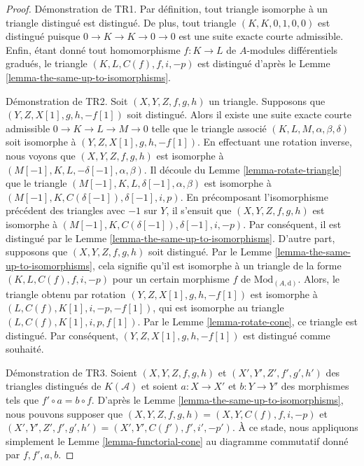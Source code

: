 \begin{proof}
Démonstration de TR1. Par définition, tout triangle isomorphe à un triangle
distingué est distingué. De plus, tout triangle $(K, K, 0, 1, 0, 0)$ est distingué
puisque $0 \to K \to K \to 0 \to 0$ est une suite exacte courte admissible. Enfin,
étant donné tout homomorphisme $f : K \to L$ de $A$-modules différentiels
gradués, le triangle $(K, L, C(f), f, i, -p)$ est distingué d'après le Lemme
\ref{lemma-the-same-up-to-isomorphisms}.

\medskip\noindent
Démonstration de TR2. Soit $(X, Y, Z, f, g, h)$ un triangle. Supposons que $(Y, Z,
X[1], g, h, -f[1])$ soit distingué. Alors il existe une suite exacte courte
admissible $0 \to K \to L \to M \to 0$ telle que le triangle associé $(K, L, M,
\alpha, \beta, \delta)$ soit isomorphe à $(Y, Z, X[1], g, h, -f[1])$. En
effectuant une rotation inverse, nous voyons que $(X, Y, Z, f, g, h)$ est
isomorphe à $(M[-1], K, L, -\delta[-1], \alpha, \beta)$. Il découle du Lemme
\ref{lemma-rotate-triangle} que le triangle $(M[-1], K, L, \delta[-1], \alpha,
\beta)$ est isomorphe à $(M[-1], K, C(\delta[-1]), \delta[-1], i, p)$. En
précomposant l'isomorphisme précédent des triangles avec $-1$ sur $Y$, il s'ensuit
que $(X, Y, Z, f, g, h)$ est isomorphe à
$(M[-1], K, C(\delta[-1]), \delta[-1], i, -p)$. Par conséquent, il est distingué
par le Lemme \ref{lemma-the-same-up-to-isomorphisms}. D'autre part, supposons que
$(X, Y, Z, f, g, h)$ soit distingué. Par le Lemme
\ref{lemma-the-same-up-to-isomorphisms}, cela signifie qu'il est isomorphe à un
triangle de la forme $(K, L, C(f), f, i, -p)$ pour un certain morphisme $f$ de
$\text{Mod}_{(A, \text{d})}$. Alors, le triangle obtenu par rotation $(Y, Z, X[1], g, h,
-f[1])$ est isomorphe à $(L, C(f), K[1], i, -p, -f[1])$, qui est isomorphe au
triangle $(L, C(f), K[1], i, p, f[1])$. Par le Lemme \ref{lemma-rotate-cone}, ce
triangle est distingué. Par conséquent, $(Y, Z, X[1], g, h, -f[1])$ est distingué
comme souhaité.

\medskip\noindent
Démonstration de TR3. Soient $(X, Y, Z, f, g, h)$ et $(X', Y', Z', f', g', h')$
des triangles distingués de $K(\mathcal{A})$ et soient $a : X \to X'$ et $b : Y
\to Y'$ des morphismes tels que $f' \circ a = b \circ f$. D'après le Lemme
\ref{lemma-the-same-up-to-isomorphisms}, nous pouvons supposer que $(X, Y, Z, f,
g, h) = (X, Y, C(f), f, i, -p)$ et $(X', Y', Z', f', g', h') = (X', Y', C(f'), f',
i', -p')$. À ce stade, nous appliquons simplement le Lemme
\ref{lemma-functorial-cone} au diagramme commutatif donné par $f, f', a, b$.
\end{proof}

